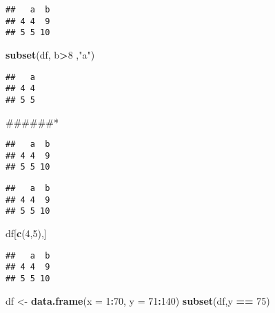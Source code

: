 \documentclass[
]{article}
\newenvironment{Shaded}{\begin{snugshade}}{\end{snugshade}}
\newcommand{\DataTypeTok}[1]{\textcolor[rgb]{0.13,0.29,0.53}{#1}}
\newcommand{\DecValTok}[1]{\textcolor[rgb]{0.00,0.00,0.81}{#1}}
\newcommand{\KeywordTok}[1]{\textcolor[rgb]{0.13,0.29,0.53}{\textbf{#1}}}
\newcommand{\NormalTok}[1]{#1}
\newcommand{\OperatorTok}[1]{\textcolor[rgb]{0.81,0.36,0.00}{\textbf{#1}}}
\newcommand{\StringTok}[1]{\textcolor[rgb]{0.31,0.60,0.02}{#1}}
\begin{document}
\begin{verbatim}
##   a  b
## 4 4  9
## 5 5 10
\end{verbatim}

\begin{Shaded}
\begin{Highlighting}[]
\KeywordTok{subset}\NormalTok{(df, b}\OperatorTok{>}\DecValTok{8}\NormalTok{ ,}\StringTok{"a"}\NormalTok{)}
\end{Highlighting}
\end{Shaded}

\begin{verbatim}
##   a
## 4 4
## 5 5
\end{verbatim}

\#\#\#\#\#\#*

\begin{Shaded}
\end{Shaded}

\begin{verbatim}
##   a  b
## 4 4  9
## 5 5 10
\end{verbatim}

\begin{Shaded}
\end{Shaded}

\begin{verbatim}
##   a  b
## 4 4  9
## 5 5 10
\end{verbatim}

\begin{Shaded}
\begin{Highlighting}[]
\NormalTok{df[}\KeywordTok{c}\NormalTok{(}\DecValTok{4}\NormalTok{,}\DecValTok{5}\NormalTok{),]}
\end{Highlighting}
\end{Shaded}

\begin{verbatim}
##   a  b
## 4 4  9
## 5 5 10
\end{verbatim}

\begin{Shaded}
\begin{Highlighting}[]
\NormalTok{df <-}\StringTok{ }\KeywordTok{data.frame}\NormalTok{(}\DataTypeTok{x =} \DecValTok{1}\OperatorTok{:}\DecValTok{70}\NormalTok{, }\DataTypeTok{y =} \DecValTok{71}\OperatorTok{:}\DecValTok{140}\NormalTok{)}
\KeywordTok{subset}\NormalTok{(df,y }\OperatorTok{==}\StringTok{ }\DecValTok{75}\NormalTok{)}
\end{Highlighting}
\end{Shaded}
\end{document}
